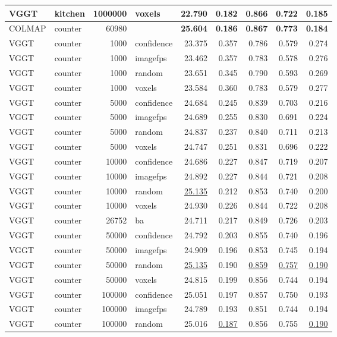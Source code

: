 \begin{table}[H]
\begin{tabular}{llrlrrrrr}
VGGT & kitchen & 1000000 & voxels & 22.790 & 0.182 & 0.866 & 0.722 & 0.185 \\
\midrule
COLMAP & counter & 60980 &  & \textbf{25.604} & \textbf{0.186} & \textbf{0.867} & \textbf{0.773} & \textbf{0.184} \\
VGGT & counter & 1000 & confidence & 23.375 & 0.357 & 0.786 & 0.579 & 0.274 \\
VGGT & counter & 1000 & imagefps & 23.462 & 0.357 & 0.783 & 0.578 & 0.276 \\
VGGT & counter & 1000 & random & 23.651 & 0.345 & 0.790 & 0.593 & 0.269 \\
VGGT & counter & 1000 & voxels & 23.584 & 0.360 & 0.783 & 0.579 & 0.277 \\
VGGT & counter & 5000 & confidence & 24.684 & 0.245 & 0.839 & 0.703 & 0.216 \\
VGGT & counter & 5000 & imagefps & 24.689 & 0.255 & 0.830 & 0.691 & 0.224 \\
VGGT & counter & 5000 & random & 24.837 & 0.237 & 0.840 & 0.711 & 0.213 \\
VGGT & counter & 5000 & voxels & 24.747 & 0.251 & 0.831 & 0.696 & 0.222 \\
VGGT & counter & 10000 & confidence & 24.686 & 0.227 & 0.847 & 0.719 & 0.207 \\
VGGT & counter & 10000 & imagefps & 24.892 & 0.227 & 0.844 & 0.721 & 0.208 \\
VGGT & counter & 10000 & random & \underline{25.135} & 0.212 & 0.853 & 0.740 & 0.200 \\
VGGT & counter & 10000 & voxels & 24.930 & 0.226 & 0.844 & 0.722 & 0.208 \\
VGGT & counter & 26752 & ba & 24.711 & 0.217 & 0.849 & 0.726 & 0.203 \\
VGGT & counter & 50000 & confidence & 24.792 & 0.203 & 0.855 & 0.740 & 0.196 \\
VGGT & counter & 50000 & imagefps & 24.909 & 0.196 & 0.853 & 0.745 & 0.194 \\
VGGT & counter & 50000 & random & \underline{25.135} & 0.190 & \underline{0.859} & \underline{0.757} & \underline{0.190} \\
VGGT & counter & 50000 & voxels & 24.815 & 0.199 & 0.856 & 0.744 & 0.194 \\
VGGT & counter & 100000 & confidence & 25.051 & 0.197 & 0.857 & 0.750 & 0.193 \\
VGGT & counter & 100000 & imagefps & 24.789 & 0.193 & 0.851 & 0.744 & 0.194 \\
VGGT & counter & 100000 & random & 25.016 & \underline{0.187} & 0.856 & 0.755 & \underline{0.190} \\

\end{tabular}
\end{table}
